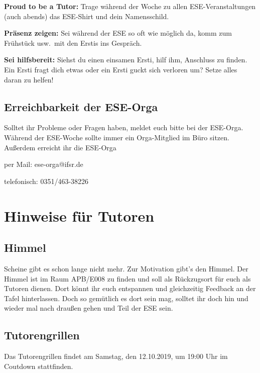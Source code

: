 \documentclass[a4paper,12pt]{report}
\begin{document}
\begin{itemize*}
    \item \textbf{Proud to be a Tutor:} Trage während der Woche zu allen ESE-Veranstaltungen (auch abends) das ESE-Shirt und dein Namensschild.
    \item \textbf{Präsenz zeigen:} Sei während der ESE so oft wie möglich da, komm zum Frühstück usw.\ mit den Erstis ins Gespräch.
    \item \textbf{Sei hilfsbereit:} Siehst du einen einsamen Ersti, hilf ihm, Anschluss zu finden. Ein Ersti fragt dich etwas oder ein Ersti guckt sich verloren um? Setze alles daran zu helfen!
\end{itemize*}

\section*{Erreichbarkeit der ESE-Orga}

Solltet ihr Probleme oder Fragen haben, meldet euch bitte bei der ESE-Orga.
Während der ESE-Woche sollte immer ein Orga-Mitglied im Büro sitzen.
Außerdem erreicht ihr die ESE-Orga
\begin{itemize*}
	\item per Mail: ese-orga@ifsr.de
	\item telefonisch: 0351/463-38226
\end{itemize*}


\tableofcontents
\chapter{Hinweise für Tutoren}
\section{Himmel}
Scheine gibt es schon lange nicht mehr. Zur Motivation gibt's den Himmel. Der Himmel ist im Raum APB/E008 zu finden und soll als Rückzugsort für euch als Tutoren dienen. Dort könnt ihr euch entspannen und gleichzeitig Feedback an der Tafel hinterlassen. Doch so gemütlich es dort sein mag, solltet ihr doch hin und wieder mal nach draußen gehen und Teil der ESE sein.

\section{Tutorengrillen}
Das Tutorengrillen findet am Samstag, den 12.10.2019, um 19:00 Uhr im Coutdown stattfinden.
\end{document}
